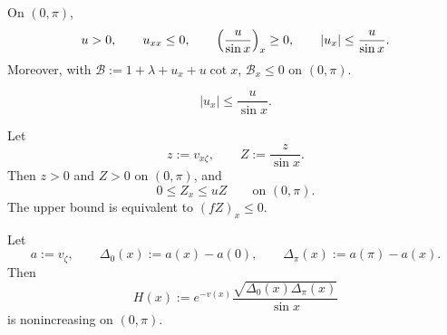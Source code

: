 \documentclass[10pt,a4paper]{amsart}
\begin{document}
\begin{lemma}[Shape of $u$]\label{lem:u-shape}
On $(0,\pi)$,
\begin{equation}\label{eq:shape}
u>0,\qquad u_{xx}\leq 0,\qquad
\Bigl(\frac{u}{\sin x}\Bigr)_x\geq 0,\qquad
|u_x|\leq\frac{u}{\sin x}.
\end{equation}
Moreover, with $\mathcal B:=1+\lambda+u_x+u\cot x$, $\mathcal B_x\leq 0$ on
$(0,\pi)$.
\end{lemma}

\begin{equation}\label{eq:chord}
|u_x|\leq\frac{u}{\sin x} .
\end{equation}

\begin{lemma}\label{lem:Z-bounds}
Let
\[
z:=v_{x\zeta},\qquad Z:=\frac{z}{\sin x}.
\]
Then $z>0$ and $Z>0$ on $(0,\pi)$, and
\[
0\leq Z_x\leq uZ\qquad\text{on }(0,\pi).
\]
The upper bound is equivalent to $(fZ)_x\leq 0$.
\end{lemma}

\begin{lemma}\label{lem:geometric-mean}
Let
\[
a:=v_\zeta,\qquad
\Delta_0(x):=a(x)-a(0),\qquad \Delta_\pi(x):=a(\pi)-a(x).
\]
Then
\[
H(x):=e^{-v(x)}\frac{\sqrt{\Delta_0(x)\Delta_\pi(x)}}{\sin x}
\]
is nonincreasing on $(0,\pi)$.
\end{lemma}
\end{document}
